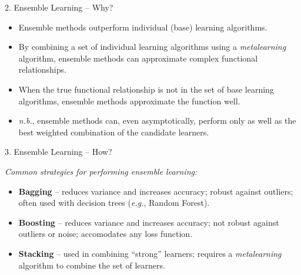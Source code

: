 \documentclass[12pt,t]{beamer}
\begin{document}
\begin{frame}[c]{2. Ensemble Learning -- Why?}

\vspace*{3mm}

\centering

  \begin{itemize}
    \itemsep12pt
    \item Ensemble methods outperform individual (base) learning algorithms.
    \item By combining a set of individual learning algorithms using a
          \textit{metalearning} algorithm, ensemble methods can approximate
          complex functional relationships.
    \item When the true functional relationship is not in the set of base
          learning algorithms, ensemble methods approximate the function well.
    \item \textit{n.b.}, ensemble methods can, even asymptotically, perform only
          as well as the best weighted combination of the candidate learners.
  \end{itemize}
\end{frame}


\begin{frame}[c]{3. Ensemble Learning -- How?}

\vspace*{3mm}

\textit{Common strategies for performing ensemble learning:}

\vspace{1em}

\centering

  \begin{itemize}
    \itemsep12pt
    \item \textbf{Bagging} -- reduces variance and increases accuracy; robust
          against outliers; often used with decision trees (\textit{e.g.},
          Random Forest).
    \item \textbf{Boosting} -- reduces variance and increases accuracy; not
          robust against outliers or noise; accomodates any loss function.
    \item \textbf{Stacking} -- used in combining ``strong'' learners; requires
          a \textit{metalearning} algorithm to combine the set of learners.
  \end{itemize}

\note{
}
\end{frame}
\end{document}
